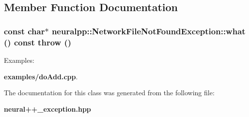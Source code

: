 \subsection{Member Function Documentation}
\subsubsection[what]{\setlength{\rightskip}{0pt plus 5cm}const char$\ast$ neuralpp::NetworkFileNotFoundException::what () const  throw ()\hspace{0.3cm}{\tt  [inline]}}\label{classneuralpp_1_1NetworkFileNotFoundException_24cde7729ab22d343f36e638cfc40702}


\begin{Desc}
\item[Examples: ]\par
{\bf examples/doAdd.cpp}.\end{Desc}


The documentation for this class was generated from the following file:\begin{CompactItemize}
\item 
{\bf neural++\_\-exception.hpp}\end{CompactItemize}
